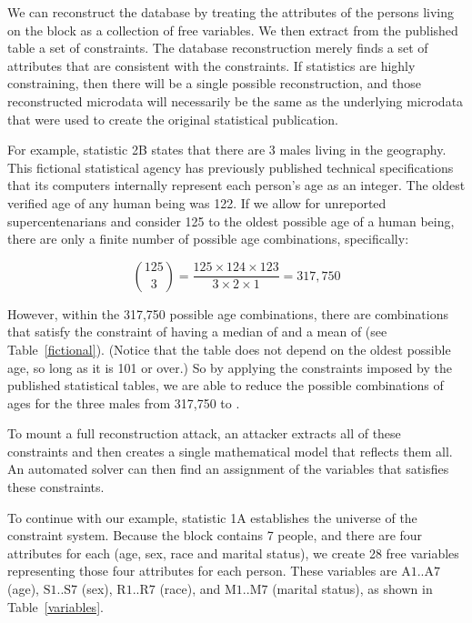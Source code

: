 \documentclass[runningheads]{llncs}
\begin{document}
We can reconstruct the database by treating the attributes
of the persons living on the block as a collection of 
free variables. We then extract from the published table a set of
constraints. The database reconstruction merely finds a set of
attributes that are consistent with the constraints. If statistics are
highly constraining, then there will be a single possible
reconstruction, and those reconstructed microdata will necessarily be the same as the underlying
microdata that were used to create the original statistical publication.

For example, statistic 2B states that there are 3 males living in the
geography.  This fictional statistical agency has previously published technical
specifications that its computers internally represent each person's age as an
integer. The oldest verified age of any human being was
122\cite{whitney}. If we allow for unreported supercentenarians and
consider 125 to the oldest possible age of a human being, there
are only a finite number of possible age combinations, specifically:

\[ \binom{125}{3}=\frac{125 \times 124 \times 123}{3 \times 2 \times
  1} = 317,750 \]


However, within the 317,750 possible age combinations, there are
\mycount{} combinations that satisfy the constraint of having a median
of \mymedian{} and a mean of \mymean{} (see
Table~\ref{fictional}). (Notice that the table does not depend on the
oldest possible age, so long as it is 101 or over.) So
by applying the constraints imposed by the published statistical
tables, we are able to reduce the possible combinations of ages for
the three males from 317,750 to \mycount.

To mount a full reconstruction attack, an attacker extracts all of these
constraints and then creates a
single mathematical model that reflects them all. An automated solver can then
find an assignment of the variables that satisfies these constraints. 

To continue with our example, statistic 1A establishes the universe of
the constraint system. Because the block contains 7 people, and there
are four attributes for each (age, sex, race and marital status), we
create 28 free variables representing those four attributes for each
person. These variables are $\textrm{A}1..\textrm{A}7$ (age),
$\textrm{S}1..\textrm{S}7$ (sex), $\textrm{R}1..\textrm{R}7$ (race),
and $\textrm{M}1..\textrm{M}7$ (marital status), as shown in
Table~\ref{variables}.
\end{document}
